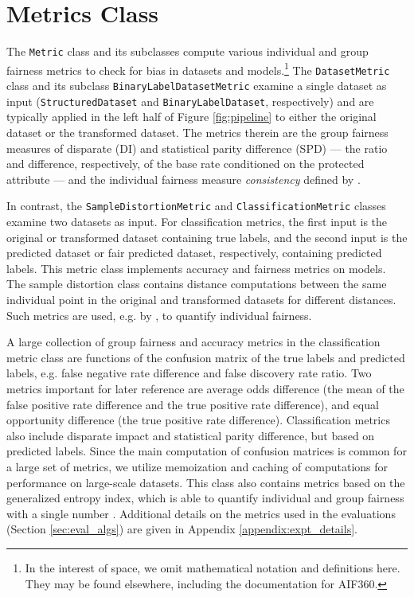 \documentclass{article}
\begin{document}
\section{Metrics Class}
\label{sec:metricsclass}

The \texttt{Metric} class and its subclasses compute various individual and group fairness metrics to check for bias in datasets and models.\footnote{In the interest of space, we omit mathematical notation and definitions here. They may be found elsewhere, including the documentation for AIF360.}  The \texttt{DatasetMetric} class and its subclass \texttt{BinaryLabelDatasetMetric} examine a single dataset as input (\texttt{StructuredDataset} and \texttt{BinaryLabelDataset}, respectively) and are typically applied in the left half of Figure \ref{fig:pipeline} to either the original dataset or the transformed dataset.  The metrics therein are the group fairness measures of disparate  (DI) and statistical parity difference (SPD) --- the ratio and difference, respectively, of the base rate conditioned on the protected attribute --- and the individual fairness measure \emph{consistency} defined by \citet{zemel2013fairrepresentations}.

In contrast, the \texttt{SampleDistortionMetric} and \texttt{ClassificationMetric} classes examine two datasets as input. For classification metrics, the first input is the original or transformed dataset containing true labels, and the second input is the predicted dataset or fair predicted dataset, respectively, containing predicted labels.  This metric class implements accuracy and fairness metrics on models.  The sample distortion class contains distance computations between the same individual point in the original and transformed datasets for different distances. Such metrics are used, e.g. by \citet{CalmonWVRV2017}, to quantify individual fairness.  

A large collection of group fairness and accuracy metrics in the classification metric class are functions of the confusion matrix of the true labels and predicted labels, e.g. false negative rate difference and false discovery rate ratio. Two metrics important for later reference are average odds difference (the mean of the false positive rate difference and the true positive rate difference), and equal opportunity difference (the true positive rate difference).  Classification metrics also include disparate impact and statistical parity difference, but based on predicted labels.  Since the main computation of confusion matrices is common for a large set of metrics, we utilize memoization and caching of computations for performance on large-scale datasets.  This class also contains metrics based on the generalized entropy index, which is able to quantify individual and group fairness with a single number \cite{Speicher2018}. Additional details on the metrics used in the evaluations (Section \ref{sec:eval_algs}) are given in Appendix \ref{appendix:expt_details}.
\end{document}
